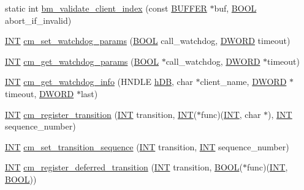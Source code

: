 \begin{DoxyCompactItemize}
\item 
static int \hyperlink{group__cmfunctionc_gab85c5c492c0ebadafe7b08fde9a4e946}{bm\_\-validate\_\-client\_\-index} (const \hyperlink{structBUFFER}{BUFFER} $\ast$buf, \hyperlink{vt2_8h_a239c7f0d40651c3e419c5b9651507d14}{BOOL} abort\_\-if\_\-invalid)
\item 
\hyperlink{vppg_8h_a392e62da233ed3e2f7c3fd4f487a3896}{INT} \hyperlink{group__cmfunctionc_gaf98a4288e4c02da7c75f3e0326ff0e72}{cm\_\-set\_\-watchdog\_\-params} (\hyperlink{vt2_8h_a239c7f0d40651c3e419c5b9651507d14}{BOOL} call\_\-watchdog, \hyperlink{vt2_8h_a798af1e30bc65f319c1a246cecf59e39}{DWORD} timeout)
\item 
\hyperlink{vppg_8h_a392e62da233ed3e2f7c3fd4f487a3896}{INT} \hyperlink{group__cmfunctionc_ga1873a038ab84d2f812f92c02fed97eea}{cm\_\-get\_\-watchdog\_\-params} (\hyperlink{vt2_8h_a239c7f0d40651c3e419c5b9651507d14}{BOOL} $\ast$call\_\-watchdog, \hyperlink{vt2_8h_a798af1e30bc65f319c1a246cecf59e39}{DWORD} $\ast$timeout)
\item 
\hyperlink{vppg_8h_a392e62da233ed3e2f7c3fd4f487a3896}{INT} \hyperlink{group__cmfunctionc_ga31688f905a1b4a3271dfea8b178e1108}{cm\_\-get\_\-watchdog\_\-info} (HNDLE \hyperlink{mevb_8c_ab1f60c53f74e806a3b9f687af38d7421}{hDB}, char $\ast$client\_\-name, \hyperlink{vt2_8h_a798af1e30bc65f319c1a246cecf59e39}{DWORD} $\ast$timeout, \hyperlink{vt2_8h_a798af1e30bc65f319c1a246cecf59e39}{DWORD} $\ast$last)
\item 
\hyperlink{vppg_8h_a392e62da233ed3e2f7c3fd4f487a3896}{INT} \hyperlink{group__cmfunctionc_ga00950930acadf846be75239b6d0e80dc}{cm\_\-register\_\-transition} (\hyperlink{vppg_8h_a392e62da233ed3e2f7c3fd4f487a3896}{INT} transition, \hyperlink{vppg_8h_a392e62da233ed3e2f7c3fd4f487a3896}{INT}($\ast$func)(\hyperlink{vppg_8h_a392e62da233ed3e2f7c3fd4f487a3896}{INT}, char $\ast$), \hyperlink{vppg_8h_a392e62da233ed3e2f7c3fd4f487a3896}{INT} sequence\_\-number)
\item 
\hyperlink{vppg_8h_a392e62da233ed3e2f7c3fd4f487a3896}{INT} \hyperlink{group__cmfunctionc_gac4b2b97d9cd12320b6f910f32e131aef}{cm\_\-set\_\-transition\_\-sequence} (\hyperlink{vppg_8h_a392e62da233ed3e2f7c3fd4f487a3896}{INT} transition, \hyperlink{vppg_8h_a392e62da233ed3e2f7c3fd4f487a3896}{INT} sequence\_\-number)
\item 
\hyperlink{vppg_8h_a392e62da233ed3e2f7c3fd4f487a3896}{INT} \hyperlink{group__cmfunctionc_gaa043c651932a8d63ce6104a9ad79f370}{cm\_\-register\_\-deferred\_\-transition} (\hyperlink{vppg_8h_a392e62da233ed3e2f7c3fd4f487a3896}{INT} transition, \hyperlink{vt2_8h_a239c7f0d40651c3e419c5b9651507d14}{BOOL}($\ast$func)(\hyperlink{vppg_8h_a392e62da233ed3e2f7c3fd4f487a3896}{INT}, \hyperlink{vt2_8h_a239c7f0d40651c3e419c5b9651507d14}{BOOL}))

\end{DoxyCompactItemize}
